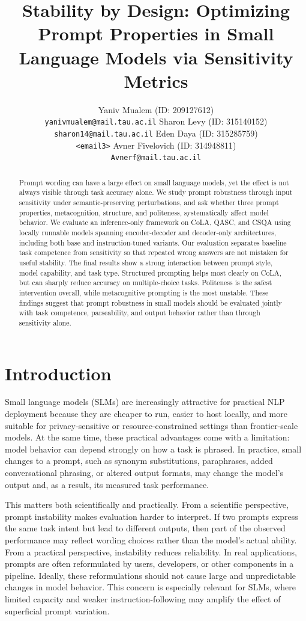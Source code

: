 \documentclass[11pt]{article}
\title{Stability by Design: Optimizing Prompt Properties in Small Language Models via Sensitivity Metrics}
\author{
Yaniv Mualem (ID: 209127612) \\
\texttt{yanivmualem@mail.tau.ac.il}
\And
Sharon Levy (ID: 315140152) \\
\texttt{sharon14@mail.tau.ac.il}
\AND
Eden Daya (ID: 315285759) \\
\texttt{<email3>}
\And
Avner Fivelovich (ID: 314948811) \\
\texttt{Avnerf@mail.tau.ac.il}
\\[0.5em]
\multicolumn{2}{c}{\textbf{Moodle Group Number: <GROUP NUMBER>}}
}
\begin{document}
\maketitle

\begin{abstract}
Prompt wording can have a large effect on small language models, yet the effect is not always visible through task accuracy alone. We study prompt robustness through input sensitivity under semantic-preserving perturbations, and ask whether three prompt properties, metacognition, structure, and politeness, systematically affect model behavior. We evaluate an inference-only framework on CoLA, QASC, and CSQA using locally runnable models spanning encoder-decoder and decoder-only architectures, including both base and instruction-tuned variants. Our evaluation separates baseline task competence from sensitivity so that repeated wrong answers are not mistaken for useful stability. The final results show a strong interaction between prompt style, model capability, and task type. Structured prompting helps most clearly on CoLA, but can sharply reduce accuracy on multiple-choice tasks. Politeness is the safest intervention overall, while metacognitive prompting is the most unstable. These findings suggest that prompt robustness in small models should be evaluated jointly with task competence, parseability, and output behavior rather than through sensitivity alone.
\end{abstract}

\section{Introduction}

Small language models (SLMs) are increasingly attractive for practical NLP deployment because they are cheaper to run, easier to host locally, and more suitable for privacy-sensitive or resource-constrained settings than frontier-scale models. At the same time, these practical advantages come with a limitation: model behavior can depend strongly on how a task is phrased. In practice, small changes to a prompt, such as synonym substitutions, paraphrases, added conversational phrasing, or altered output formats, may change the model's output and, as a result, its measured task performance.

This matters both scientifically and practically. From a scientific perspective, prompt instability makes evaluation harder to interpret. If two prompts express the same task intent but lead to different outputs, then part of the observed performance may reflect wording choices rather than the model's actual ability. From a practical perspective, instability reduces reliability. In real applications, prompts are often reformulated by users, developers, or other components in a pipeline. Ideally, these reformulations should not cause large and unpredictable changes in model behavior. This concern is especially relevant for SLMs, where limited capacity and weaker instruction-following may amplify the effect of superficial prompt variation.
\end{document}
